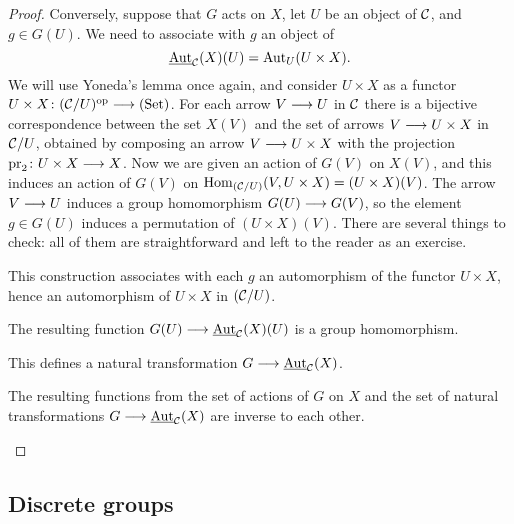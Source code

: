 \begin{2   CONTRAVARIANT FUNCTORS}
\begin{2.2 Group objects}
\begin{proof}
Conversely, suppose that $G$ acts on $X$, let $U$ be an object of $\mathcal{C}$, and $g \in G(U)$. We need to associate with $g$ an object of 
   \[
   \mathop{\underline{\mathrm{Aut}}}\nolimits_{\mathcal{C}}(X)(U) = \operatorname{Aut}_{U}(U \times X).
   \]
We will use Yoneda's lemma once again, and consider $U \times X$ as a functor $U \times X \colon (\cC/U)\op \arr \catset$. For each arrow $V \arr U$ in $\mathcal{C}$ there is a bijective correspondence between the set $X(V)$ and the set of arrows $V \arr U \times X$ in $\mathcal{C}/U$, obtained by composing an arrow $V \arr U \times X$ with the projection $\pr_{2}\colon U \times X \arr X$. Now we are given an action of $G(V)$ on $X(V)$, and this induces an action of $G(V)$ on $\operatorname{Hom}_{(\mathcal{C}/U)}(V, U \times X) = (U \times X)(V)$. The arrow $V \arr U$ induces a group homomorphism $G(U) \arr G(V)$, so the element $g \in G(U)$ induces a permutation of $(U \times X)(V)$. There are several things to check: all of them are straightforward and left to the reader as an exercise.

\begin{enumeratei}

\item This construction associates with each $g$ an automorphism of the functor $U \times X$, hence an automorphism of $U \times X$ in $(\mathcal{C}/U)$.

\item The resulting function $G(U) \arr \underaut_{\cC}(X)(U)$ is a group homomorphism.

\item This defines a natural transformation $G \arr \underaut_{\cC}(X)$.

\item The resulting functions from the set of actions of $G$ on $X$ and the set of natural transformations $G \arr \underaut_{\cC}(X)$ are inverse to each other.\qedhere

\end{enumeratei}
\end{proof}



\subsection{Discrete groups}\label{subsec:discrete-groups}


\end{2.2 Group objects}
\end{2   CONTRAVARIANT FUNCTORS}
